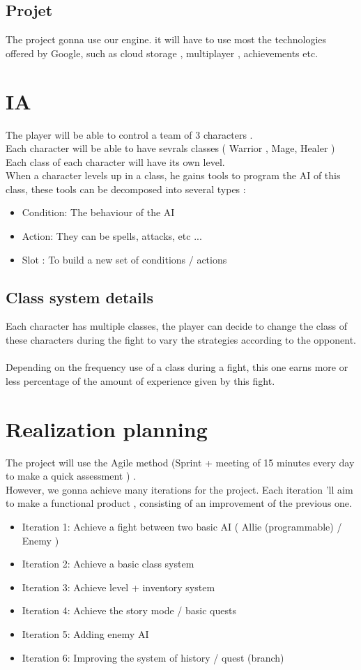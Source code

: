 \documentclass[16pt, oneside]{report}
\begin{document}
\section{Projet}
The project gonna use our engine. it will have to use most the technologies offered by Google, such as cloud storage , multiplayer , achievements  etc.

\chapter{IA}
The player will be able to control a team of 3 characters . \\
Each character will be able to have sevrals classes ( Warrior , Mage, Healer ) \\
Each class of each character will have its own level. \\
When a character levels up in a class, he gains tools to program the AI of this class, these tools can be decomposed into several types :
\begin {itemize}
\item Condition: The behaviour of the AI
\item Action: They can be spells, attacks, etc ...
\item Slot : To build a new set of conditions / actions
\end {itemize}

\section{Class system details}
Each character has multiple classes, the player can decide to change the class of these characters during the fight to vary the strategies according to the opponent.\\\\
Depending on the frequency use of a class during a fight, this one earns more or less percentage of the amount of experience given by this fight.

\chapter{Realization planning}
The project will use the Agile method (Sprint + meeting of 15 minutes every day to make a quick assessment ) . \\
However, we gonna achieve many iterations for the project. Each iteration 'll aim to make a functional product , consisting of an improvement of the previous one.\\
\begin{itemize}
\item Iteration 1: Achieve a fight between two basic AI ( Allie (programmable) / Enemy )
\item Iteration 2: Achieve a basic class system
\item Iteration 3: Achieve level + inventory system
\item Iteration 4: Achieve the story mode / basic quests
\item Iteration 5: Adding enemy AI
\item Iteration 6: Improving the system of history / quest (branch)\\
\end{itemize}
\end{document}
